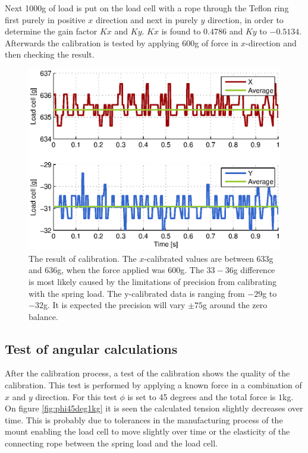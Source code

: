 \noindent
Next 1000g of load is put on the load cell with a rope through the Teflon ring first purely in positive $x$ direction and next in purely $y$ direction, in order to determine the gain factor $Kx$ and $Ky$. $Kx$ is found to $0.4786$ and $Ky$ to $-0.5134$. Afterwards the calibration is tested by applying $600$g of force in $x$-direction and then checking the result.

\begin{figure}[hbtp]
\centering
\includegraphics[scale=1]{graphics/gcs_test/calib_result_compare.eps}
\caption[Result of calibration for Horizontal Measurement Device]{The result of calibration. The $x$-calibrated values are between $633$g and $636$g, when the force applied was $600$g. The $33-36$g difference is most likely caused by the limitations of precision from calibrating with the spring load. The y-calibrated data is ranging from $-29$g to $-32$g. It is expected the precision will vary $\pm75$g around the zero balance.}
\end{figure}

\newpage
\subsection{Test of angular calculations}
After the calibration process, a test of the calibration shows the quality of the calibration.
This test is performed by applying a known force in a combination of $x$ and $y$ direction. For this test $\phi$ is set to 45 degrees and the total force is $1$kg. On figure \ref{fig:phi45deg1kg} it is seen the calculated tension slightly decreases over time. This is probably due to tolerances in the manufacturing process of the mount enabling the load cell to move slightly over time or the elasticity of the connecting rope between the spring load and the load cell.

